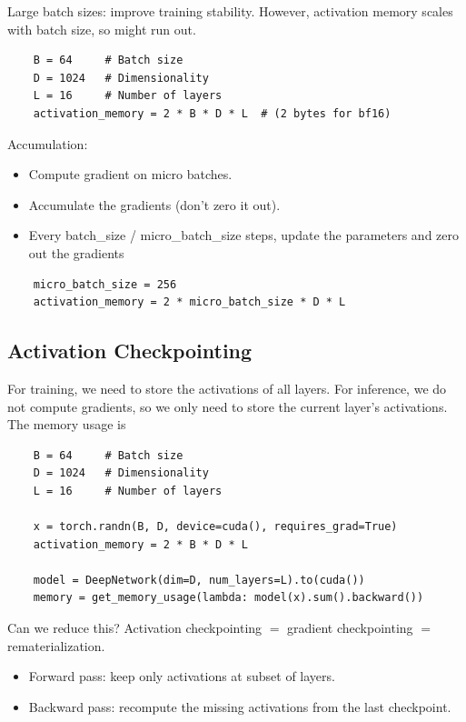 \documentclass[12pt,twoside]{article}
\begin{document}
Large batch sizes: improve training stability. However, activation memory scales with batch size, so might run out.

\begin{verbatim}
    B = 64     # Batch size
    D = 1024   # Dimensionality
    L = 16     # Number of layers
    activation_memory = 2 * B * D * L  # (2 bytes for bf16)
\end{verbatim}

Accumulation:

\begin{itemize}
    \item Compute gradient on micro batches.
    \item Accumulate the gradients (don't zero it out).
    \item Every batch\_size / micro\_batch\_size steps, update the parameters and zero out the gradients
\end{itemize}

\begin{verbatim}
    micro_batch_size = 256
    activation_memory = 2 * micro_batch_size * D * L
\end{verbatim}

\subsection*{Activation Checkpointing}

For training, we need to store the activations of all layers. For inference, we do not compute gradients, so we only need to store the current layer's activations. The memory usage is

\begin{verbatim}
    B = 64     # Batch size
    D = 1024   # Dimensionality
    L = 16     # Number of layers
    
    x = torch.randn(B, D, device=cuda(), requires_grad=True)
    activation_memory = 2 * B * D * L  
    
    model = DeepNetwork(dim=D, num_layers=L).to(cuda())  
    memory = get_memory_usage(lambda: model(x).sum().backward()) 
\end{verbatim}

Can we reduce this? Activation checkpointing \(=\) gradient checkpointing \(=\) rematerialization.

\begin{itemize}
    \item Forward pass: keep only activations at subset of layers.
    \item Backward pass: recompute the missing activations from the last checkpoint.
\end{itemize}
\end{document}
